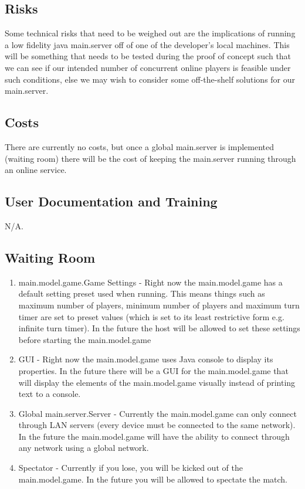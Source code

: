 \documentclass[12pt, titlepage]{article}
\begin{document}
\subsection{Risks}
Some technical risks that need to be weighed out are the implications of running a low fidelity java main.server off of one of the developer's local machines. This will be something that needs to be tested during the proof of concept such that we can see if our intended number of concurrent online players is feasible under such conditions, else we may wish to consider some off-the-shelf solutions for our main.server.

\subsection{Costs}
There are currently no costs, but once a global main.server is implemented (waiting room) there will be the cost of keeping the main.server running through an online service.

\subsection{User Documentation and Training}
N/A.
\subsection{Waiting Room}
\begin{enumerate}
    \item main.model.game.Game Settings - Right now the main.model.game has a default setting preset used when running. This means things such as maximum number of players, minimum number of players and maximum turn timer are set to preset values (which is set to its least restrictive form e.g. infinite turn timer). In the future the host will be allowed to set these settings before starting the main.model.game
    
    \item GUI - Right now the main.model.game uses Java console to display its properties. In the future there will be a GUI for the main.model.game that will display the elements of the main.model.game visually instead of printing text to a console.
    
    \item Global main.server.Server - Currently the main.model.game can only connect through LAN servers (every device must be connected to the same network). In the future the main.model.game will have the ability to connect through any network using a global network.
    
    \item Spectator - Currently if you lose, you will be kicked out of the main.model.game. In the future you will be allowed to spectate the match.

\end{enumerate}
    
\end{document}
